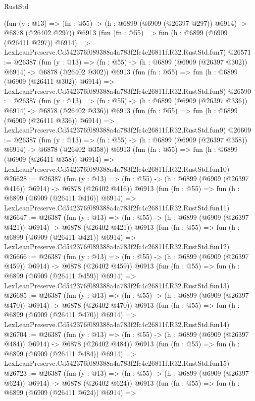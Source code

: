 \begin{lexlean}{RustStd}
\begin{coremodule}
    (fun (y : @13) => (fn : @55) -> (h : @6899 (@6909 (@26397 @297)) @6914) -> @6878 (@26402 @297))
    @6913
    (fun (fn : @55) =>
    fun (h : @6899 (@6909 (@26411 @297)) @6914) =>
    LexLeanPreserve.Cd542376f089388a4a783f2fc4c26811f.R32.RustStd.fun7)
@26571 := @26387
    (fun (y : @13) => (fn : @55) -> (h : @6899 (@6909 (@26397 @302)) @6914) -> @6878 (@26402 @302))
    @6913
    (fun (fn : @55) =>
    fun (h : @6899 (@6909 (@26411 @302)) @6914) =>
    LexLeanPreserve.Cd542376f089388a4a783f2fc4c26811f.R32.RustStd.fun8)
@26590 := @26387
    (fun (y : @13) => (fn : @55) -> (h : @6899 (@6909 (@26397 @336)) @6914) -> @6878 (@26402 @336))
    @6913
    (fun (fn : @55) =>
    fun (h : @6899 (@6909 (@26411 @336)) @6914) =>
    LexLeanPreserve.Cd542376f089388a4a783f2fc4c26811f.R32.RustStd.fun9)
@26609 := @26387
    (fun (y : @13) => (fn : @55) -> (h : @6899 (@6909 (@26397 @358)) @6914) -> @6878 (@26402 @358))
    @6913
    (fun (fn : @55) =>
    fun (h : @6899 (@6909 (@26411 @358)) @6914) =>
    LexLeanPreserve.Cd542376f089388a4a783f2fc4c26811f.R32.RustStd.fun10)
@26628 := @26387
    (fun (y : @13) => (fn : @55) -> (h : @6899 (@6909 (@26397 @416)) @6914) -> @6878 (@26402 @416))
    @6913
    (fun (fn : @55) =>
    fun (h : @6899 (@6909 (@26411 @416)) @6914) =>
    LexLeanPreserve.Cd542376f089388a4a783f2fc4c26811f.R32.RustStd.fun11)
@26647 := @26387
    (fun (y : @13) => (fn : @55) -> (h : @6899 (@6909 (@26397 @421)) @6914) -> @6878 (@26402 @421))
    @6913
    (fun (fn : @55) =>
    fun (h : @6899 (@6909 (@26411 @421)) @6914) =>
    LexLeanPreserve.Cd542376f089388a4a783f2fc4c26811f.R32.RustStd.fun12)
@26666 := @26387
    (fun (y : @13) => (fn : @55) -> (h : @6899 (@6909 (@26397 @459)) @6914) -> @6878 (@26402 @459))
    @6913
    (fun (fn : @55) =>
    fun (h : @6899 (@6909 (@26411 @459)) @6914) =>
    LexLeanPreserve.Cd542376f089388a4a783f2fc4c26811f.R32.RustStd.fun13)
@26685 := @26387
    (fun (y : @13) => (fn : @55) -> (h : @6899 (@6909 (@26397 @470)) @6914) -> @6878 (@26402 @470))
    @6913
    (fun (fn : @55) =>
    fun (h : @6899 (@6909 (@26411 @470)) @6914) =>
    LexLeanPreserve.Cd542376f089388a4a783f2fc4c26811f.R32.RustStd.fun14)
@26704 := @26387
    (fun (y : @13) => (fn : @55) -> (h : @6899 (@6909 (@26397 @484)) @6914) -> @6878 (@26402 @484))
    @6913
    (fun (fn : @55) =>
    fun (h : @6899 (@6909 (@26411 @484)) @6914) =>
    LexLeanPreserve.Cd542376f089388a4a783f2fc4c26811f.R32.RustStd.fun15)
@26723 := @26387
    (fun (y : @13) => (fn : @55) -> (h : @6899 (@6909 (@26397 @624)) @6914) -> @6878 (@26402 @624))
    @6913
    (fun (fn : @55) =>
    fun (h : @6899 (@6909 (@26411 @624)) @6914) =>

\end{coremodule}
\end{lexlean}
